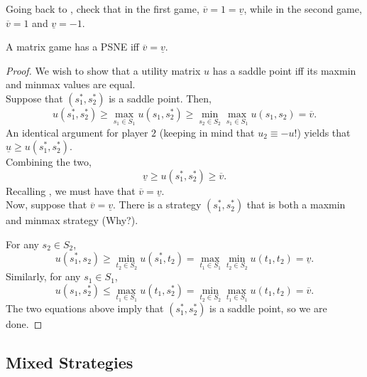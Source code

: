 	Going back to , check that in the first game, $\overline{v} = 1 = \underline{v}$, while in the second game, $\overline{v} = 1$ and $\underline{v} = -1$.

	\begin{ftheo}
		A matrix game has a PSNE iff $\overline{v} = \underline{v}$.
	\end{ftheo}
	\begin{proof}
		We wish to show that a utility matrix $u$ has a saddle point iff its maxmin and minmax values are equal.\\
		
		Suppose that $(s_1^*,s_2^*)$ is a saddle point. Then,
		\[ u(s_1^*,s_2^*) \ge \max_{s_1 \in S_1} u(s_1,s_2^*) \ge \min_{s_2 \in S_2} \max_{s_1 \in S_1} u(s_1,s_2) = \overline{v}. \]
		An identical argument for player $2$ (keeping in mind that $u_2 \equiv -u$!) yields that $\underline{u} \ge u(s_1^*,s_2^*)$.\\
		Combining the two,
		\[ \underline{v} \ge u(s_1^*,s_2^*) \ge \overline{v}. \]
		Recalling , we must have that $\overline{v} = \underline{v}$.\\

		Now, suppose that $\overline{v} = \underline{v}$. There is a strategy $(s_1^*,s_2^*)$ that is both a maxmin and minmax strategy (Why?).

		For any $s_2 \in S_2$,
		\[ u(s_1^*,s_2) \ge \min_{t_2 \in S_2} u(s_1^*,t_2) = \max_{t_1 \in S_1} \min_{t_2 \in S_2} u(t_1,t_2) = \underline{v}. \]
		Similarly, for any $s_1 \in S_1$,
		\[ u(s_1,s_2^*) \le \max_{t_1 \in S_1} u(t_1,s_2^*) = \min_{t_2 \in S_2} \max_{t_1 \in S_1} u(t_1,t_2) = \overline{v}. \]
		The two equations above imply that $(s_1^*,s_2^*)$ is a saddle point, so we are done.
	\end{proof}

\subsection{Mixed Strategies}

